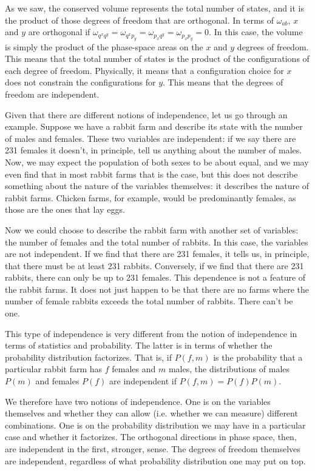 As we saw, the conserved volume represents the total number of states, and it is the product of those degrees of freedom that are orthogonal. In terms of $\omega_{ab}$, $x$ and $y$ are orthogonal if $\omega_{q^x q^y} = \omega_{q^x p_y} = \omega_{p_x q^y} = \omega_{p_x p_y} = 0$. In this case, the volume is simply the product of the phase-space areas on the $x$ and $y$ degrees of freedom. This means that the total number of states is the product of the configurations of each degree of freedom. Physically, it means that a configuration choice for $x$ does not constrain the configurations for $y$. This means that the degrees of freedom are independent.

Given that there are different notions of independence, let us go through an example. Suppose we have a rabbit farm and describe its state with the number of males and females. These two variables are independent: if we say there are 231 females it doesn't, in principle, tell us anything about the number of males. Now, we may expect the population of both sexes to be about equal, and we may even find that in most rabbit farms that is the case, but this does not describe something about the nature of the variables themselves: it describes the nature of rabbit farms. Chicken farms, for example, would be predominantly females, as those are the ones that lay eggs.

Now we could choose to describe the rabbit farm with another set of variables: the number of females and the total number of rabbits. In this case, the variables are not independent. If we find that there are 231 females, it tells us, in principle, that there must be at least 231 rabbits. Conversely, if we find that there are 231 rabbits, there can only be up to 231 females. This dependence is not a feature of the rabbit farms. It does not just happen to be that there are no farms where the number of female rabbits exceeds the total number of rabbits. There can't be one.

This type of independence is very different from the notion of independence in terms of statistics and probability. The latter is in terms of whether the probability distribution factorizes. That is, if $P(f,m)$ is the probability that a particular rabbit farm has $f$ females and $m$ males, the distributions of males $P(m)$ and females $P(f)$ are independent if $P(f,m) = P(f) P(m)$. 

We therefore have two notions of independence. One is on the variables themselves and whether they can allow (i.e. whether we can measure) different combinations. One is on the probability distribution we may have in a particular case and whether it factorizes. The orthogonal directions in phase space, then, are independent in the first, stronger, sense. The degrees of freedom themselves are independent, regardless of what probability distribution one may put on top.

